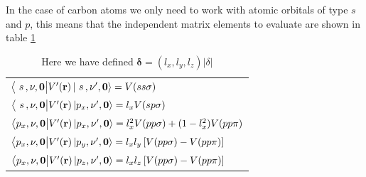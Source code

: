 In the case of carbon atoms we only need to work with atomic orbitals of type $s$ and $p$, this means that the independent matrix elements to evaluate are shown in table \ref{tab:matrix}
\begin{table}
    \label{tab:matrix}
    \begin{center}
        \begin{tabular}{l}
            \hline
            $\big\langle \,\,s\,,\nu,\mathbf{0}\big|V'(\mathbf{r})\ket{\,\,s\,,\nu',\mathbf{0}}=V(ss\sigma)$\\
            $\big\langle \,\,s\,,\nu,\mathbf{0}\big|V'(\mathbf{r})\ket{p_x,\nu',\mathbf{0}}=l_xV(sp\sigma)$\\
            $\big\langle p_x,\nu,\mathbf{0}\big|V'(\mathbf{r})\ket{p_x,\nu',\mathbf{0}}=l_x^2V(pp\sigma)+(1-l_x^2)V(pp\pi)$\\
            $\big\langle p_x,\nu,\mathbf{0}\big|V'(\mathbf{r})\ket{p_y,\nu',\mathbf{0}}=l_xl_y\left[V(pp\sigma)-V(pp\pi)\right]$\\
            $\big\langle p_x,\nu,\mathbf{0}\big|V'(\mathbf{r})\ket{p_z,\nu',\mathbf{0}}=l_xl_z\left[V(pp\sigma)-V(pp\pi)\right]$\\
            \hline
        \end{tabular}
        \caption{ Here we have defined $\boldsymbol\delta=(l_x,l_y,l_z)|\delta|$}
    \end{center}
\end{table}

